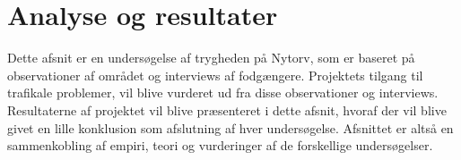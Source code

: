 \section{Analyse og resultater}
Dette afsnit er en undersøgelse af trygheden på Nytorv, som er baseret på observationer af området og interviews af fodgængere. Projektets tilgang til trafikale problemer, vil blive vurderet ud fra disse observationer og interviews. Resultaterne af projektet vil blive præsenteret i dette afsnit, hvoraf der vil blive givet en lille konklusion som afslutning af hver undersøgelse. Afsnittet er altså en sammenkobling af empiri, teori og vurderinger af de forskellige undersøgelser. 





